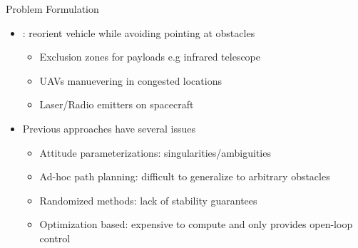 \begin{frame}[t]{Problem Formulation} %
\begin{itemize}
    \item {} : reorient vehicle while avoiding pointing at obstacles
    \begin{itemize}
        \item Exclusion zones for payloads e.g infrared telescope
        \item UAVs manuevering in congested locations
        \item Laser/Radio emitters on spacecraft
    \end{itemize}
    \pause
    \item Previous approaches have several issues
    \begin{itemize}
        \item Attitude parameterizations: singularities/ambiguities
        \item Ad-hoc path planning: difficult to generalize to arbitrary obstacles
        \item Randomized methods: lack of stability guarantees
        \item Optimization based: expensive to compute and only provides open-loop control  
    \end{itemize}
\end{itemize}
\end{frame} %

